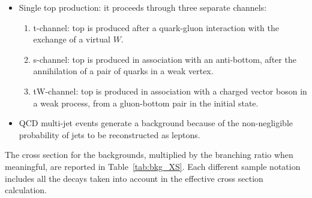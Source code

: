 \begin{itemize}
  \item Single top production: it proceeds through three separate channels:
       \begin{enumerate}
         \item t-channel: top is produced after a quark-gluon interaction 
               with the exchange of a virtual $W$.
         \item s-channel: top is produced in association with an anti-bottom, 
               after the annihilation of a pair of quarks in a weak vertex.
         \item tW-channel: top is produced in association with a charged vector boson in a weak process, 
               from a gluon-bottom pair in the initial state.
       \end{enumerate}
  \item QCD multi-jet events generate a background 
       because of the non-negligible probability of jets to be reconstructed as leptons.
\end{itemize}

The cross section for the backgrounds, multiplied by the branching ratio when meaningful, 
are reported in Table~\ref{tab:bkg_XS}. 
Each different sample notation includes all the decays taken into account 
in the effective cross section calculation.

